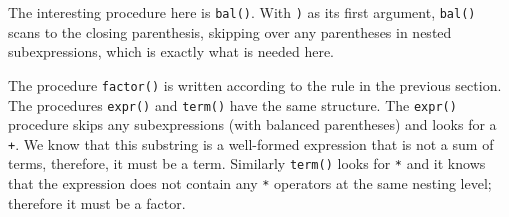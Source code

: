 
The interesting procedure here is \texttt{bal()}. With
\texttt{{\textquotesingle}){\textquotesingle}} as its first argument,
\texttt{bal()} scans to the closing parenthesis, skipping over any
parentheses in nested subexpressions, which is exactly what is needed
here.

The procedure \texttt{factor()} is written according to the rule in the
previous section. The procedures \texttt{expr()} and \texttt{term()}
have the same structure. The \texttt{expr()} procedure skips any
subexpressions (with balanced parentheses) and looks for a \texttt{+}.
We know that this substring is a well-formed expression that is not a
sum of terms, therefore, it must be a term. Similarly \texttt{term()}
looks for \texttt{*} and it knows that the expression does not contain
any \texttt{*} operators at the same nesting level; therefore it must
be a factor.


